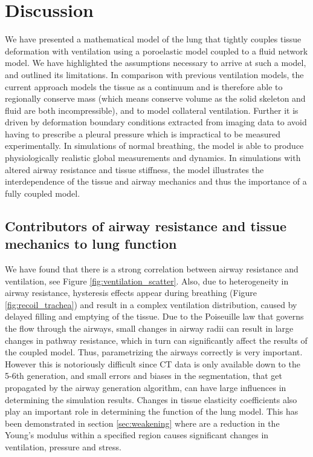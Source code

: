 \section{Discussion}
\label{sec:conclusion}
We have presented a mathematical model of the lung that tightly couples tissue deformation with ventilation using a poroelastic model coupled to a fluid network model. We have highlighted the assumptions necessary to arrive at such a model, and outlined its limitations. In comparison with previous ventilation models, the current approach models the tissue as a continuum and is therefore able to regionally conserve mass (which means conserve volume as the solid skeleton and fluid are both incompressible), and to model collateral ventilation. Further it is driven by deformation boundary conditions extracted from imaging data to avoid having to prescribe a pleural pressure which is impractical to be measured experimentally. In simulations of normal breathing, the model is able to produce physiologically realistic global measurements and dynamics. In simulations with altered airway resistance and tissue stiffness, the model illustrates the interdependence of the tissue and airway mechanics and thus the importance of a fully coupled model.
%
\subsection{Contributors of airway resistance and tissue mechanics to lung function}
We have found that there is a strong correlation between airway resistance and ventilation, see Figure \ref{fig:ventilation_scatter}. Also, due to heterogeneity in airway resistance, hysteresis effects appear during breathing (Figure \ref{fig:recoil_trachea}) and result in a complex ventilation distribution, caused by delayed filling and emptying of the tissue. Due to the Poiseuille law that governs the flow through the airways, small changes in airway radii can result in large changes in pathway resistance, which in turn can significantly affect the results of the coupled model. Thus, parametrizing the airways correctly is very important. However this is notoriously difficult since CT data is only available down to the 5-6th generation, and small errors and biases in the segmentation, that get propagated by the airway generation algorithm, can have large influences in determining the simulation results. Changes in tissue elasticity coefficients also play an important role in determining the function of the lung model. This has been demonstrated in section \ref{sec:weakening} where are a reduction in the Young's modulus within a specified region causes significant changes in ventilation, pressure and stress.

